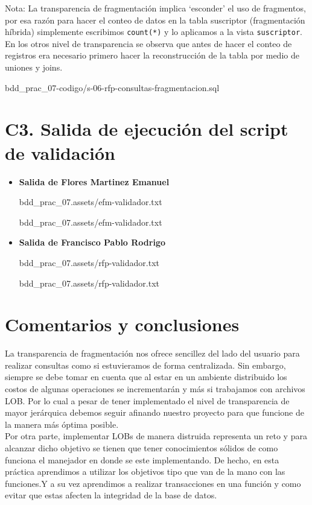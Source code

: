 \documentclass{article}
\newcommand{\codedir}{bdd_prac_07-codigo}
\begin{document}
  Nota: La transparencia de fragmentación implica `esconder' el uso de 
  fragmentos, por esa razón para hacer el conteo de datos en la tabla
  suscriptor (fragmentación híbrida) simplemente escribimos \texttt{count(*)} 
  y lo aplicamos a la vista \texttt{suscriptor}. \\

  En los otros nivel de transparencia se observa que antes de hacer el conteo
  de registros era necesario primero hacer la reconstrucción de la tabla
  por medio de uniones y joins.

  
  {\codedir/s-06-rfp-consultas-fragmentacion.sql}

\section*{C3. Salida de ejecución del script de validación}

\begin{itemize}
  \item  \textbf{Salida de Flores Martinez Emanuel}
  
    {bdd_prac_07.assets/efm-validador.txt}
  
    {bdd_prac_07.assets/efm-validador.txt}

  \item \textbf{Salida de Francisco Pablo Rodrigo}
  
    {bdd_prac_07.assets/rfp-validador.txt}
  
    {bdd_prac_07.assets/rfp-validador.txt}
\end{itemize}

\section*{Comentarios y conclusiones}

La transparencia de fragmentación nos ofrece sencillez del lado del usuario 
para realizar consultas como si estuvieramos de forma centralizada. Sin 
embargo, siempre se debe tomar en cuenta que al estar en un ambiente 
distribuido los costos de algunas operaciones se incrementarán y más si 
trabajamos con archivos LOB. Por lo cual a pesar de tener implementado el 
nivel de transparencia de mayor jerárquica debemos seguir afinando nuestro
proyecto para que funcione de la manera más óptima posible.\\

Por otra parte, implementar LOBs de manera distruida representa un reto y 
para alcanzar dicho objetivo se tienen que tener conocimientos sólidos de 
como funciona el manejador en donde se este implementando. De hecho, en esta
práctica aprendimos a utilizar los objetivos tipo que van de la mano con las 
funciones.Y a su vez aprendimos a realizar transacciones en una función y como
evitar que estas afecten la integridad de la base de datos.
\end{document}
